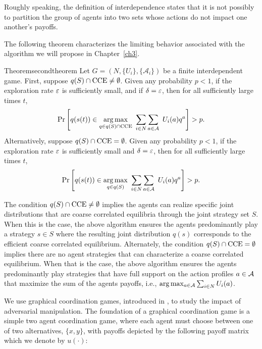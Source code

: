 Roughly speaking, the definition of interdependence states that it is not possibly to partition the group of agents into two sets whose actions do not impact one another's payoffs.

The following theorem characterizes the limiting behavior associated with the algorithm we will propose in Chapter~\ref{ch3}. 

\begin{restatable}{Theorem}{secondtheorem}\label{t:main theorem CCE}
%
Let $G = \left (N,\{U_i\},\{\mathcal{A}_i\}\right)$ be a finite interdependent game. 
%
First, suppose $q(S) \cap {\rm CCE} \neq \emptyset$.  Given any probability $p < 1$, if the exploration rate $\varepsilon$ is sufficiently small, and if $\delta = \varepsilon$, then for all sufficiently large times $t$, 
%
$$ {\rm Pr} \left[q(s(t)) \in \underset{ q \in q(S) \cap {\rm CCE}}{\arg \max} \ \sum_{i \in N} \sum_{a \in \aee} \ U_i(a) q^a \right] > p. $$ 
%
Alternatively, suppose $q(S) \cap {\rm CCE} = \emptyset$.  Given any probability $p < 1$, if the exploration rate $\varepsilon$ is sufficiently small and $\delta = \varepsilon$, then for all sufficiently large times $t$, 
%
$$ {\rm Pr} \left[q(s(t)) \in \underset{ q \in q(S)}{\arg \max} \ \sum_{i \in N} \sum_{a \in {\cal A}} \ U_i(a) q^a \right] > p. $$ 
%
\end{restatable}

The condition $q(S) \cap {\rm CCE} \neq \emptyset$ implies the agents can realize specific joint distributions that are coarse correlated equilibria through the joint strategy set $S$.  When this is the case, the above algorithm ensures the agents predominantly play a strategy $s \in S$ where the resulting joint distribution $q(s)$ corresponds to the efficient coarse correlated equilibrium.  Alternately, the condition $q(S) \cap {\rm CCE} = \emptyset$ implies there are no agent strategies that can characterize a coarse correlated equilibrium.  When that is the case, the above algorithm  ensures the agents predominantly play strategies that have full support on the action profiles $a \in {\cal A}$ that maximize the sum of the agents payoffs, i.e., $\arg \max_{a \in {\cal A}} \sum_{i \in N} U_i(a)$.



We use graphical coordination games, introduced in \cite{Cooper1999, Ullmann1977}, to study the impact of adversarial manipulation.  The foundation of a graphical coordination game is a simple two agent coordination game, where each agent must choose between one of two alternatives, $\{x,y\}$, with payoffs depicted by the following payoff matrix which we denote by $u(\cdot)$: 


